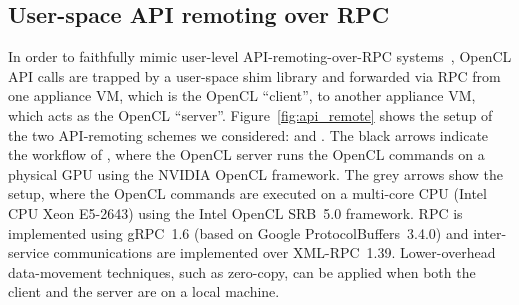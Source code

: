 




\subsection{User-space API remoting over RPC} \label{sec:api_remote_design}

In order to faithfully mimic user-level API-remoting-over-RPC
systems~\cite{rCUDA,kim2012snucl,bitfusion-whitepaper},
OpenCL API calls are trapped by a user-space shim library and forwarded via RPC
from one appliance VM, which is the OpenCL ``client'',
to another appliance VM, which acts as the OpenCL ``server''.
Figure~\ref{fig:api_remote} shows the setup of the two API-remoting schemes
we considered: \apigpu and \apicpu.
The black arrows indicate the workflow of \apigpu, where the OpenCL server
runs the OpenCL commands on a physical GPU using the NVIDIA OpenCL
framework. The grey arrows show the \apicpu setup, where the OpenCL commands
are executed on a multi-core CPU (Intel CPU Xeon E5-2643) using the Intel
OpenCL SRB~5.0 framework.
RPC is implemented using gRPC~1.6 (based on Google ProtocolBuffers~3.4.0) and
inter-service communications are implemented over XML-RPC~1.39. Lower-overhead
data-movement techniques, such as zero-copy, can be applied when both the
client and the server are on a local machine.

